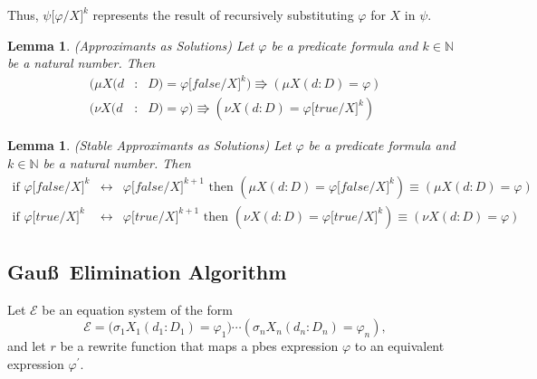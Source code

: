 \documentclass{article}
\newtheorem{lemma}[theorem]{Lemma}
\begin{document}
Thus, $\psi \lbrack \varphi /X]^{k}$ represents the result of recursively
substituting $\varphi $ for $X$ in $\psi $.

\begin{lemma}
(Approximants as Solutions) Let $\varphi $ be a predicate formula and $k\in 
\mathbb{N}$ be a natural number. Then%
\begin{eqnarray*}
(\mu X(d &:&D)=\varphi \lbrack false /X]^{k})\Rrightarrow (\mu
X(d:D)=\varphi ) \\
(\nu X(d &:&D)=\varphi )\Rrightarrow (\nu X(d:D)=\varphi \lbrack true
/X]^{k})
\end{eqnarray*}
\end{lemma}

\begin{lemma}
(Stable Approximants as Solutions) Let $\varphi $ be a predicate formula and 
$k\in \mathbb{N}$ be a natural number. Then%
\begin{eqnarray*}
\text{if }\varphi \lbrack false/X]^{k} &\longleftrightarrow &\varphi \lbrack
false/X]^{k+1}\text{ then }(\mu X(d:D)=\varphi \lbrack false/X]^{k})\equiv
(\mu X(d:D)=\varphi ) \\
\text{if }\varphi \lbrack true/X]^{k} &\longleftrightarrow &\varphi \lbrack
true/X]^{k+1}\text{ then }(\nu X(d:D)=\varphi \lbrack true/X]^{k})\equiv
(\nu X(d:D)=\varphi )
\end{eqnarray*}
\end{lemma}

\subsection{Gau\ss\ Elimination Algorithm}

Let $\mathcal{E}$ be an equation system of the form%
\begin{equation*}
\mathcal{E=(}\sigma _{1}X_{1}(d_{1}:D_{1})=\varphi _{1})\cdots (\sigma
_{n}X_{n}(d_{n}:D_{n})=\varphi _{n}),
\end{equation*}%
and let $r$ be a rewrite function that maps a pbes expression $\varphi $ to
an equivalent expression $\varphi ^{\prime }$.
\end{document}
